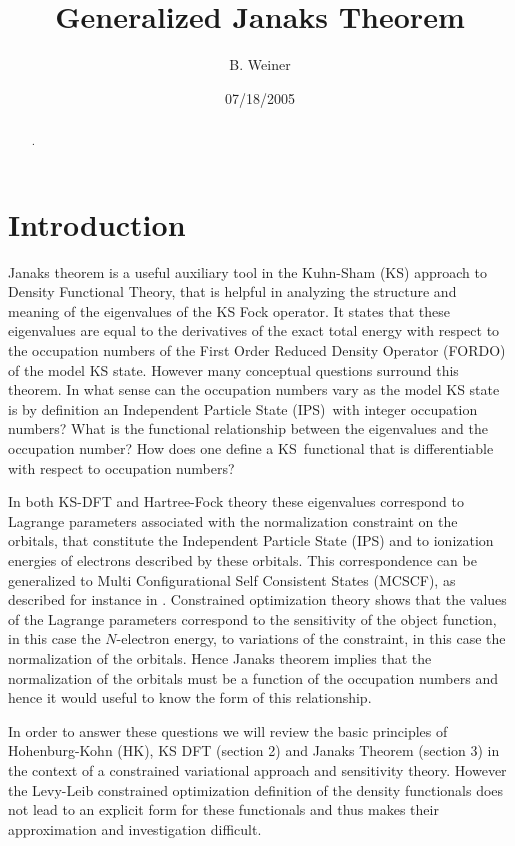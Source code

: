 \documentclass[aps,preprint]{revtex4}%
\begin{document}
\preprint{ }
\title[Janaks Theorem]{Generalized Janaks Theorem}
\author{B. Weiner}
\keywords{}
\pacs{}

\begin{abstract}
.

\end{abstract}
\date{07/18/2005}
\maketitle
\tableofcontents


\section{Introduction\label{Intro}}

Janaks theorem is a useful auxiliary tool in the Kuhn-Sham (KS) approach to
Density Functional Theory, that is helpful in analyzing the structure and
meaning of the eigenvalues of the KS Fock operator. It states that these
eigenvalues are equal to the derivatives of the exact total energy with
respect to the occupation numbers of the First Order Reduced Density Operator
(FORDO) of the model KS state. However many conceptual questions surround this
theorem. In what sense can the occupation numbers vary as the model KS state
is by definition an Independent Particle State (IPS)\ with integer occupation
numbers? What is the functional relationship between the eigenvalues and the
occupation number? How does one define a KS\ functional that is differentiable
with respect to occupation numbers?

In both KS-DFT and Hartree-Fock theory these eigenvalues correspond to
Lagrange parameters associated with the normalization constraint on the
orbitals, that constitute the Independent Particle State (IPS) and to
ionization energies of electrons described by these orbitals. This
correspondence can be generalized to Multi Configurational Self Consistent
States (MCSCF), as described for instance in \cite{WeinerOrtiz05}. Constrained
optimization theory \cite{Hestenes} shows that the values of the Lagrange
parameters correspond to the sensitivity of the object function, in this case
the $N$-electron energy, to variations of the constraint, in this case the
normalization of the orbitals. Hence Janaks theorem implies that the
normalization of the orbitals must be a function of the occupation numbers and
hence it would useful to know the form of this relationship.

In order to answer these questions we will review the basic principles of
Hohenburg-Kohn (HK), KS DFT (section 2) and Janaks Theorem (section 3) in the
context of a constrained variational approach and sensitivity theory. However
the Levy-Leib constrained optimization definition of the density functionals
does not lead to an explicit form for these functionals and thus makes their
approximation and investigation difficult.
\end{document}
